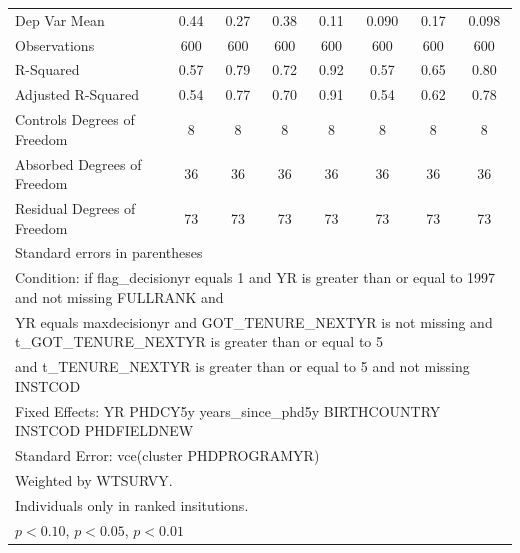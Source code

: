 \begin{table}[htbp]
\begin{tabular}{l*{7}{c}}
\hline
Dep Var Mean&        0.44         &        0.27         &        0.38         &        0.11         &       0.090         &        0.17         &       0.098         \\
Observations&         600         &         600         &         600         &         600         &         600         &         600         &         600         \\
R-Squared&        0.57         &        0.79         &        0.72         &        0.92         &        0.57         &        0.65         &        0.80         \\
Adjusted R-Squared&        0.54         &        0.77         &        0.70         &        0.91         &        0.54         &        0.62         &        0.78         \\
Controls Degrees of Freedom&           8         &           8         &           8         &           8         &           8         &           8         &           8         \\
Absorbed Degrees of Freedom&          36         &          36         &          36         &          36         &          36         &          36         &          36         \\
Residual Degrees of Freedom&          73         &          73         &          73         &          73         &          73         &          73         &          73         \\
\hline\hline
\multicolumn{8}{l}{\footnotesize Standard errors in parentheses}\\
\multicolumn{8}{l}{\footnotesize Condition: if flag\_decisionyr equals 1 and YR is greater than or equal to 1997 and not missing FULLRANK and}\\
\multicolumn{8}{l}{\footnotesize YR equals maxdecisionyr and GOT\_TENURE\_NEXTYR is not missing and t\_GOT\_TENURE\_NEXTYR is greater than or equal to 5}\\
\multicolumn{8}{l}{\footnotesize and t\_TENURE\_NEXTYR is greater than or equal to 5 and not missing INSTCOD}\\
\multicolumn{8}{l}{\footnotesize Fixed Effects: YR PHDCY5y years\_since\_phd5y BIRTHCOUNTRY INSTCOD PHDFIELDNEW}\\
\multicolumn{8}{l}{\footnotesize Standard Error: vce(cluster PHDPROGRAMYR)}\\
\multicolumn{8}{l}{\footnotesize Weighted by WTSURVY.}\\
\multicolumn{8}{l}{\footnotesize Individuals only in ranked insitutions.}\\
\multicolumn{8}{l}{\footnotesize \sym{*} \(p<0.10\), \sym{**} \(p<0.05\), \sym{***} \(p<0.01\)}\\
\end{tabular}
\end{table}
